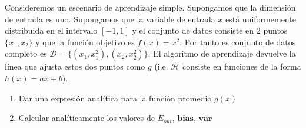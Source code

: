 \documentclass[11pt,leqno]{article}
\theoremstyle{definition}
\begin{document}
\begin{cuestion}
Consideremos un escenario de aprendizaje simple. Supongamos que la dimensión de entrada es uno. Supongamos que la variable de entrada $x$ está uniformemente distribuida en el intervalo $[-1, 1]$ y el conjunto de datos consiste en 2 puntos $\{x_1, x_2\}$ y que la función objetivo es $f(x) = x^2$. Por tanto es conjunto de datos completo es $\mathcal{D} = \{(x_1, x^2_1), (x_2 , x_2^2)\}$. El algoritmo de aprendizaje devuelve la línea que ajusta estos dos puntos como $g$ (i.e. $\mathcal{H}$ consiste en funciones de la forma $h(x) = ax + b$).
\begin{enumerate}[a]
\item Dar una expresión analítica para la función promedio $\bar{g}(x)$
\item Calcular analíticamente los valores de $E_{out}$, $\textbf{bias}$, $\textbf{var}$
\end{enumerate}
\end{cuestion}
\end{document}
